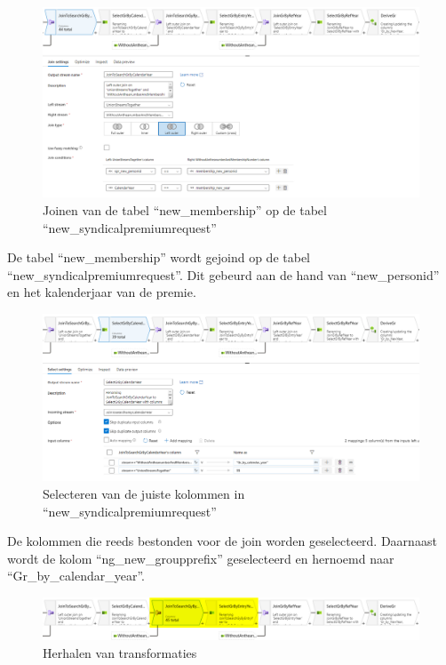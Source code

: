 \begin{figure}[H]
    \centering
    \includegraphics[width=1\textwidth]{./graphics/adf/gr_1.png}
    \caption{Joinen van de tabel ``new\_membership'' op de tabel ``new\_syndicalpremiumrequest''}
\end{figure}

De tabel ``new\_membership'' wordt gejoind op de tabel ``new\_syndicalpremiumrequest''. Dit gebeurd aan de hand van ``new\_personid'' en het kalenderjaar van de premie.

\begin{figure}[H]
    \centering
    \includegraphics[width=1\textwidth]{./graphics/adf/gr_2.png}
    \caption{Selecteren van de juiste kolommen in ``new\_syndicalpremiumrequest''}
\end{figure}

De kolommen die reeds bestonden voor de join worden geselecteerd. Daarnaast wordt de kolom ``ng\_new\_groupprefix'' geselecteerd en hernoemd naar ``Gr\_by\_calendar\_year''.

\begin{figure}[H]
    \centering
    \includegraphics[width=1\textwidth]{./graphics/adf/gr_3.png}
    \caption{Herhalen van transformaties}
\end{figure}


